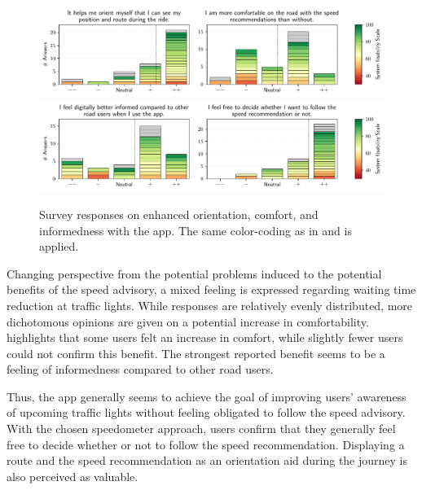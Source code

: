 \begin{figure}[t]
\caption{Survey responses on enhanced orientation, comfort, and informedness with the app. The same color-coding as in  and  is applied.}\label{fig:app-enhanced-orientation}
\includegraphics[width=\linewidth]{images/app-usability-questions-app-enhanced-orientation.pdf}
\\
\includegraphics[width=\linewidth]{images/app-usability-questions-app-informedness-freedom.pdf}
\end{figure}

Changing perspective from the potential problems induced to the potential benefits of the speed advisory, a mixed feeling is expressed regarding waiting time reduction at traffic lights. While responses are relatively evenly distributed, more dichotomous opinions are given on a potential increase in comfortability.  highlights that some users felt an increase in comfort, while slightly fewer users could not confirm this benefit. The strongest reported benefit seems to be a feeling of informedness compared to other road users. 

Thus, the app generally seems to achieve the goal of improving users' awareness of upcoming traffic lights without feeling obligated to follow the speed advisory. With the chosen speedometer approach, users confirm that they generally feel free to decide whether or not to follow the speed recommendation. Displaying a route and the speed recommendation as an orientation aid during the journey is also perceived as valuable.

